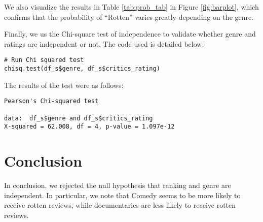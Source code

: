 \documentclass[12pt,a4paper]{article}
\begin{document}
We also visualize the results in Table \ref{tab:prob_tab} in Figure \ref{fig:barplot}, which  confirms that the probability of ``Rotten'' varies greatly depending on the genre. 



Finally, we us the Chi-square test of independence to validate whether genre and ratings are independent or not. The code used is detailed below:

\begin{verbatim}
# Run Chi squared test
chisq.test(df_s$genre, df_s$critics_rating)
\end{verbatim}

The results of the test were as follows:

\begin{verbatim}
Pearson's Chi-squared test

data:  df_s$genre and df_s$critics_rating
X-squared = 62.008, df = 4, p-value = 1.097e-12
\end{verbatim}

\section{Conclusion}

In conclusion, we rejected the null hypothesis that ranking and genre are  independent. In particular, we note that Comedy seems to be more likely to receive rotten reviews, while documentaries are less likely to receive rotten reviews. 
\end{document}
